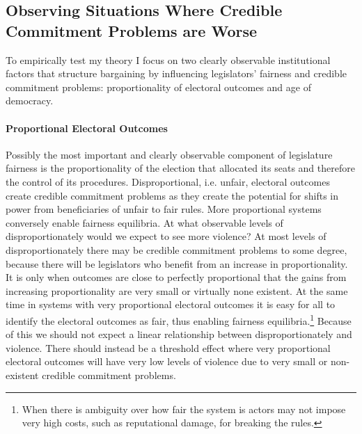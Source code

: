 \documentclass[a4paper]{article}\usepackage[]{graphicx}\usepackage[]{color}
\begin{document}
\subsection{Observing Situations Where Credible Commitment Problems are Worse}

To empirically test my theory I focus on two clearly observable institutional factors that structure bargaining by influencing legislators' fairness and credible commitment problems: proportionality of electoral outcomes and age of democracy.

\paragraph{Proportional Electoral Outcomes}

Possibly the most important and clearly observable component of legislature fairness is the proportionality of the election that allocated its seats and therefore the control of its procedures. Disproportional, i.e. unfair, electoral outcomes create credible commitment problems as they create the potential for shifts in power from beneficiaries of unfair to fair rules. More proportional systems conversely enable fairness equilibria. At what observable levels of disproportionately would we expect to see more violence? At most levels of disproportionately there may be credible commitment problems to some degree, because there will be legislators who benefit from an increase in proportionality. It is only when outcomes are close to perfectly proportional that the gains from increasing proportionality are very small or virtually none existent. At the same time in systems with very proportional electoral outcomes it is easy for all to identify the electoral outcomes as fair, thus enabling fairness equilibria.\footnote{When there is ambiguity over how fair the system is actors may not impose very high costs, such as reputational damage, for breaking the rules.} Because of this we should not expect a linear relationship between disproportionately and violence. There should instead be a threshold effect where very proportional electoral outcomes will have very low levels of violence due to very small or non-existent credible commitment problems.
\end{document}
